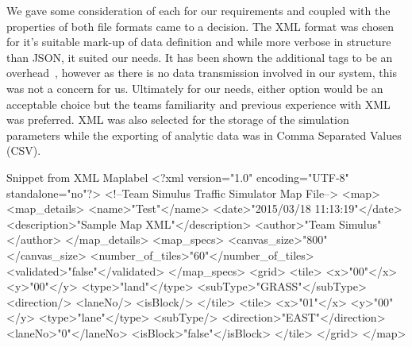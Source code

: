We gave some consideration of each for our requirements and coupled with the properties of both file formats came to a decision. The XML format was chosen for it's suitable mark-up of data definition and while more verbose in structure than JSON, it suited our needs. It has been shown the additional tags to be an overhead~\cite{codeproject2013}, however as there is no data transmission involved in our system, this was not a concern for us. Ultimately for our needs, either option would be an acceptable choice but the teams familiarity and previous experience with XML was preferred. XML was also selected for the storage of the simulation parameters while the exporting of analytic data was in Comma Separated Values (CSV).

\begin{xml-code}{Snippet from XML Map}{label}
<?xml version="1.0" encoding="UTF-8" standalone="no"?>
<!--Team Simulus Traffic Simulator Map File-->
<map>
  <map_details>
    <name>"Test"</name>
    <date>"2015/03/18 11:13:19"</date>
    <description>"Sample Map XML"</description>
    <author>"Team Simulus"</author>
  </map_details>
  <map_specs>
    <canvas_size>"800"</canvas_size>
    <number_of_tiles>"60"</number_of_tiles>
    <validated>"false"</validated>
  </map_specs>
  <grid>
    <tile>
      <x>"00"</x>
      <y>"00"</y>
      <type>"land"</type>
      <subType>"GRASS"</subType>
      <direction/>
      <laneNo/>
      <isBlock/>
    </tile>
    <tile>
      <x>"01"</x>
      <y>"00"</y>
      <type>"lane"</type>
      <subType/>
      <direction>"EAST"</direction>
      <laneNo>"0"</laneNo>
      <isBlock>"false"</isBlock>
    </tile>
  </grid>
</map>
\end{xml-code}


